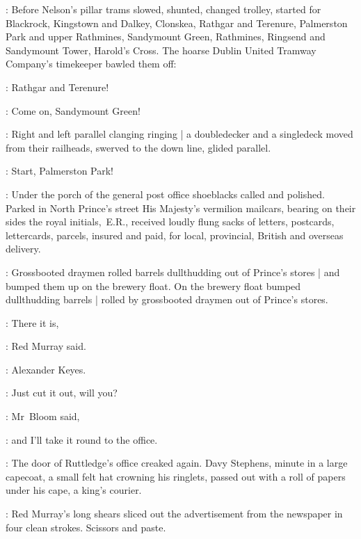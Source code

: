 \setcounter{page}{1}


:
Before Nelson's pillar trams slowed,
shunted,
changed trolley,
started for Blackrock,
Kingstown and Dalkey,
Clonskea,
Rathgar and Terenure,
Palmerston Park and upper Rathmines,
Sandymount Green,
Rathmines,
Ringsend and Sandymount Tower,
Harold's Cross.
The hoarse Dublin United Tramway Company's timekeeper bawled them off:

\timekeeper:
Rathgar and Terenure!

\timekeeper:
Come on, Sandymount Green!

:
Right and left parallel clanging ringing |
a doubledecker and a singledeck moved from their railheads,
swerved to the down line,
glided parallel.

\timekeeper:
Start, Palmerston Park!



:
Under the porch of the general post office
shoeblacks called and polished.
Parked in North Prince's street
His Majesty's vermilion mailcars,
bearing on their sides the royal initials,~E.R.,
received loudly flung sacks
of letters, postcards, lettercards, parcels, insured and paid,
for local, provincial, British and overseas delivery.



:
Grossbooted draymen rolled barrels dullthudding
out of Prince's stores |
and bumped them up on the brewery float.
On the brewery float bumped dullthudding barrels |
rolled by grossbooted draymen out of Prince's stores.

\redmurray:
There it is,

:
Red Murray said.

\redmurray:
Alexander Keyes.

\Bloom:
Just cut it out, will you?

:
Mr~Bloom said,

\Bloom:
and I'll take it round to the  office.

:
The door of Ruttledge's office creaked again.
Davy Stephens,
minute in a large capecoat,
a small felt hat crowning his ringlets,
passed out with a roll of papers under his cape,
a king's courier.

:
Red Murray's long shears sliced out the advertisement
from the newspaper in four clean strokes.
Scissors and paste.


